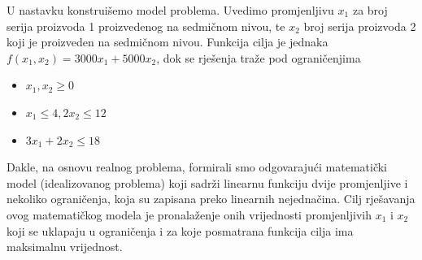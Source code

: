 \documentclass[a4paper, utf8, 11pt, colorlinks]{book}
\theoremstyle{definition}
\begin{document}
\begin{table}[!ht]
    \centering
    \caption{Procjene konstanti modela.}
    \label{tab:procjene-1}
\end{table}

U nastavku konstruišemo model problema. Uvedimo promjenljivu $x_1$ za broj serija proizvoda 1 proizvedenog na sedmičnom nivou, te $x_2$ broj serija proizvoda 2 koji je proizveden na sedmičnom nivou. Funkcija cilja je jednaka $f(x_1, x_2) = 3000 x_1 + 5000 x_2$, dok se rješenja traže pod ograničenjima
\begin{itemize}
    \item $x_1, x_2 \geq 0$
    \item  $x_1 \leq 4, 2 x_2 \leq 12$
    \item $3 x_1 + 2 x_2 \leq 18$
\end{itemize}

Dakle, na osnovu realnog problema, formirali smo odgovarajući matematički model (idealizovanog problema) koji sadrži  linearnu funkciju dvije promjenljive i nekoliko ograničenja, koja su zapisana preko linearnih nejednačina. Cilj rješavanja ovog matematičkog modela je pronalaženje onih vrijednosti promjenljivih $x_1$ i $x_2$ koji se uklapaju u ograničenja i za koje posmatrana funkcija cilja ima maksimalnu vrijednost.

\end{document}
